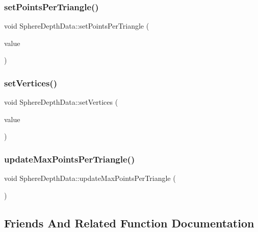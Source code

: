 \subsubsection{\texorpdfstring{set\+Points\+Per\+Triangle()}{setPointsPerTriangle()}}
{\footnotesize\ttfamily void Sphere\+Depth\+Data\+::set\+Points\+Per\+Triangle (\begin{DoxyParamCaption}\item[{const std\+::vector$<$ std\+::list$<$ Q\+Vector3D $>$ $>$ \&}]{value }\end{DoxyParamCaption})}

\mbox{\label{class_sphere_depth_data_a95e070bea3d8ec4a0449044e4616208f}} 
\subsubsection{\texorpdfstring{set\+Vertices()}{setVertices()}}
{\footnotesize\ttfamily void Sphere\+Depth\+Data\+::set\+Vertices (\begin{DoxyParamCaption}\item[{std\+::vector$<$ float $>$}]{value }\end{DoxyParamCaption})}

\mbox{\label{class_sphere_depth_data_a4cf92f63341fd72e6659dcd1501eb2ac}} 
\subsubsection{\texorpdfstring{update\+Max\+Points\+Per\+Triangle()}{updateMaxPointsPerTriangle()}}
{\footnotesize\ttfamily void Sphere\+Depth\+Data\+::update\+Max\+Points\+Per\+Triangle (\begin{DoxyParamCaption}{ }\end{DoxyParamCaption})\hspace{0.3cm}{\ttfamily [private]}}



\subsection{Friends And Related Function Documentation}
\mbox{\label{class_sphere_depth_data_a965765d9b47dfa6a5464d3e5cc39a66c}} 
